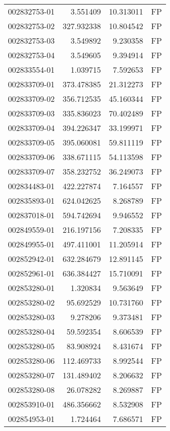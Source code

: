 \begin{tabular}{lrrl}
002832753-01 &    3.551409 &    10.313011 &   FP \\
002832753-02 &  327.932338 &    10.804542 &   FP \\
002832753-03 &    3.549892 &     9.230358 &   FP \\
002832753-04 &    3.549605 &     9.394914 &   FP \\
002833554-01 &    1.039715 &     7.592653 &   FP \\
002833709-01 &  373.478385 &    21.312273 &   FP \\
002833709-02 &  356.712535 &    45.160344 &   FP \\
002833709-03 &  335.836023 &    70.402489 &   FP \\
002833709-04 &  394.226347 &    33.199971 &   FP \\
002833709-05 &  395.060081 &    59.811119 &   FP \\
002833709-06 &  338.671115 &    54.113598 &   FP \\
002833709-07 &  358.232752 &    36.249073 &   FP \\
002834483-01 &  422.227874 &     7.164557 &   FP \\
002835893-01 &  624.042625 &     8.268789 &   FP \\
002837018-01 &  594.742694 &     9.946552 &   FP \\
002849559-01 &  216.197156 &     7.208335 &   FP \\
002849955-01 &  497.411001 &    11.205914 &   FP \\
002852942-01 &  632.284679 &    12.891145 &   FP \\
002852961-01 &  636.384427 &    15.710091 &   FP \\
002853280-01 &    1.320834 &     9.563649 &   FP \\
002853280-02 &   95.692529 &    10.731760 &   FP \\
002853280-03 &    9.278206 &     9.373481 &   FP \\
002853280-04 &   59.592354 &     8.606539 &   FP \\
002853280-05 &   83.908924 &     8.431674 &   FP \\
002853280-06 &  112.469733 &     8.992544 &   FP \\
002853280-07 &  131.489402 &     8.206632 &   FP \\
002853280-08 &   26.078282 &     8.269887 &   FP \\
002853910-01 &  486.356662 &     8.532908 &   FP \\
002854953-01 &    1.724464 &     7.686571 &   FP \\

\end{tabular}
